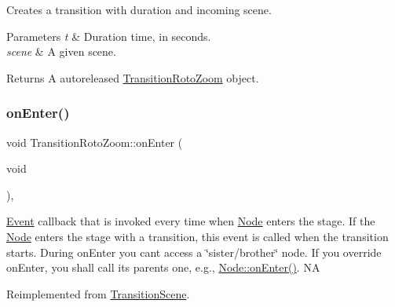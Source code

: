 Creates a transition with duration and incoming scene.


\begin{DoxyParams}{Parameters}
{\em t} & Duration time, in seconds. \\
\hline
{\em scene} & A given scene. \\
\hline
\end{DoxyParams}
\begin{DoxyReturn}{Returns}
A autoreleased \hyperlink{classTransitionRotoZoom}{Transition\+Roto\+Zoom} object. 
\end{DoxyReturn}
\mbox{\label{classTransitionRotoZoom_a087ead50631d8e2fdf62f7fd6c265caa}} 
\subsubsection{\texorpdfstring{on\+Enter()}{onEnter()}\hspace{0.1cm}{\footnotesize\ttfamily [1/2]}}
{\footnotesize\ttfamily void Transition\+Roto\+Zoom\+::on\+Enter (\begin{DoxyParamCaption}\item[{void}]{ }\end{DoxyParamCaption})\hspace{0.3cm}{\ttfamily [override]}, {\ttfamily [virtual]}}

\hyperlink{classEvent}{Event} callback that is invoked every time when \hyperlink{classNode}{Node} enters the \textquotesingle{}stage\textquotesingle{}. If the \hyperlink{classNode}{Node} enters the \textquotesingle{}stage\textquotesingle{} with a transition, this event is called when the transition starts. During on\+Enter you can\textquotesingle{}t access a \char`\"{}sister/brother\char`\"{} node. If you override on\+Enter, you shall call its parent\textquotesingle{}s one, e.\+g., \hyperlink{classNode_a7f51764c4afd5018a052b9ef71c03374}{Node\+::on\+Enter()}.  NA 

Reimplemented from \hyperlink{classTransitionScene_aace390a1bd8f3c73bb650a1e256a0f83}{Transition\+Scene}.

\mbox{\label{classTransitionRotoZoom_ac996aa76e096939509fda8a3468fc113}} 
